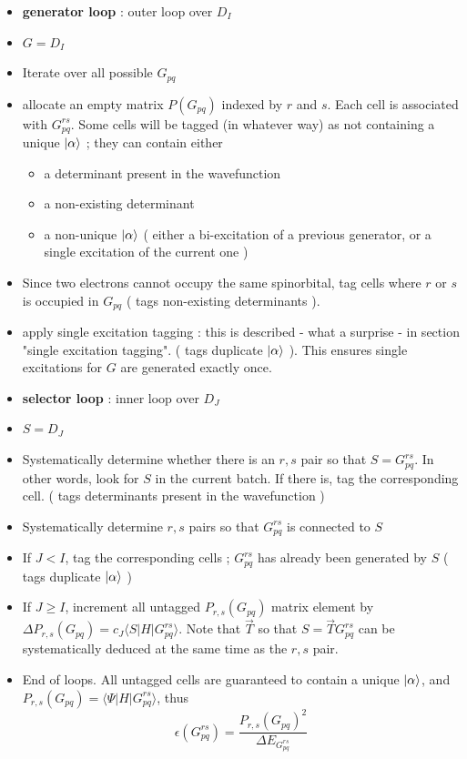 \documentclass[./thesis.tex]{subfiles}
\begin{document}
\begin{itemize}
\item
\textbf{generator loop} : outer loop over $D_I$
\item
$G = D_I$
\item
Iterate over all possible $G_{pq}$

\item
allocate an empty matrix $P(G_{pq})$ indexed by $r$ and $s$. Each cell is associated with $G^{rs}_{pq}$. Some cells will be tagged (in whatever way) as not containing a unique $\ket \alpha$ ; they can contain either
\begin{itemize}
\item
a determinant present in the wavefunction
\item
a non-existing determinant
\item
a non-unique $\ket \alpha$ ( either a bi-excitation of a previous generator, or a single excitation of the current one )
\end{itemize}

\item
Since two electrons cannot occupy the same spinorbital, tag cells where $r$ or $s$ is occupied in $G_{pq}$ ( tags non-existing determinants ). 
\item
apply single excitation tagging : this is described - what a surprise - in section "single excitation tagging". ( tags duplicate $\ket \alpha$ ). This ensures single excitations for $G$ are generated exactly once.
\item
\textbf{selector loop} : inner loop over $D_J$ 
\item
$S = D_J$
\item
Systematically determine whether there is an $r,s$ pair so that $S=G_{pq}^{rs}$. In other words, look for $S$ in the current batch. If there is, tag the corresponding cell. ( tags determinants present in the wavefunction )
\item
Systematically determine $r,s$ pairs so that $G_{pq}^{rs}$ is connected to $S$
\item
If $J<I$, tag the corresponding cells ; $G_{pq}^{rs}$ has already been generated by $S$ ( tags duplicate $\ket \alpha$ )
\item
If $J \geq I$, increment all untagged $P_{r,s}(G_{pq})$ matrix element by $\Delta P_{r,s}(G_{pq}) = c_J\langle S| H|  G^{rs}_{pq} \rangle$. Note that $\overrightarrow{T}$ so that $S=\overrightarrow{T}G^{rs}_{pq}$ can be systematically deduced at the same time as the $r,s$ pair.
\item
End of loops. All untagged cells are guaranteed to contain a unique $\ket \alpha$, and $P_{r,s}(G_{pq}) = \langle \Psi |H|G^{rs}_{pq} \rangle$, thus\\

\begin{equation}
\epsilon(G_{pq}^{rs}) = \frac{P_{r,s}(G_{pq})^2}{\Delta E_{G^{rs}_{pq}}}
\end{equation}

\end{itemize}
\end{document}
